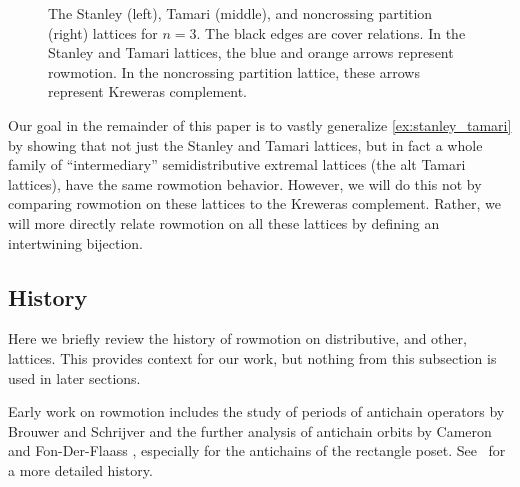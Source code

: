 \documentclass[11pt]{amsart}
\newcounter{width}
\theoremstyle{definition}
\begin{document}
\begin{figure}[ht]
\begin{center}
\end{center}
\caption{The Stanley (left), Tamari (middle), and noncrossing partition (right) lattices for $n=3$. The black edges are cover relations. In the Stanley and Tamari lattices, the blue and orange arrows represent rowmotion. In the noncrossing partition lattice, these arrows represent Kreweras complement.}
\label{fig:5-element-lattices}
\end{figure} 

Our goal in the remainder of this paper is to vastly generalize \cref{ex:stanley_tamari} by showing that not just the Stanley and Tamari lattices, but in fact a whole family of ``intermediary'' semidistributive extremal lattices (the alt Tamari lattices), have the same rowmotion behavior. However, we will do this not by comparing rowmotion on these lattices to the Kreweras complement. Rather, we will more directly relate rowmotion on all these lattices by defining an intertwining bijection.

\subsection{History}

Here we briefly review the history of rowmotion on distributive, and other, lattices. This provides context for our work, but nothing from this subsection is used in later sections.

Early work on rowmotion includes the study of periods of antichain operators by Brouwer and Schrijver \cite{brouwer1974period} and the further analysis of antichain orbits by Cameron and Fon-Der-Flaass \cite{cameron1995orbits}, especially for the antichains of the rectangle poset. See~\cite[\S7]{thomas2019rowmotion} for a more detailed history.
\end{document}
